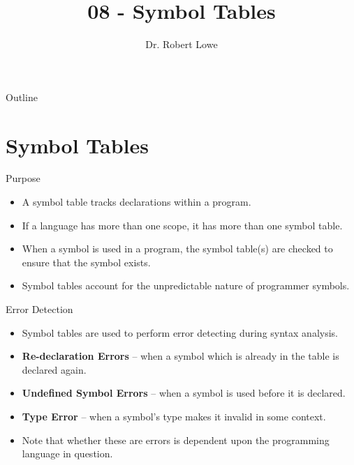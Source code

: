 \documentclass[]{beamer}
\title{08 - Symbol Tables}
\author{Dr. Robert Lowe\\}
\institute[Maryville College] %
{
  Division of Mathematics and Computer Science\\
  Maryville College
}
\date[]{}
\begin{document}
\begin{frame}
  \titlepage
\end{frame}

\begin{frame}{Outline}
  \tableofcontents
\end{frame}





\section{Symbol Tables}
\begin{frame}{Purpose}
    \begin{itemize}[<+->]
        \item A symbol table tracks declarations within a program.
        \item If a language has more than one scope, it has more than
            one symbol table.
        \item When a symbol is used in a program, the symbol table(s)
            are checked to ensure that the symbol exists.
        \item Symbol tables account for the unpredictable nature of
            programmer symbols.
    \end{itemize}
\end{frame}

\begin{frame}{Error Detection}
    \begin{itemize}[<+->]
        \item Symbol tables are used to perform error detecting during
            syntax analysis.
        \item \textbf{Re-declaration Errors} -- when a symbol
            which is already in the table is declared again. 
        \item \textbf{Undefined Symbol Errors} -- when a symbol
            is used before it is declared.
        \item \textbf{Type Error} -- when a symbol's type makes it
            invalid in some context.
        \item Note that whether these are errors is dependent upon the
            programming language in question.
    \end{itemize}
\end{frame}
\end{document}
